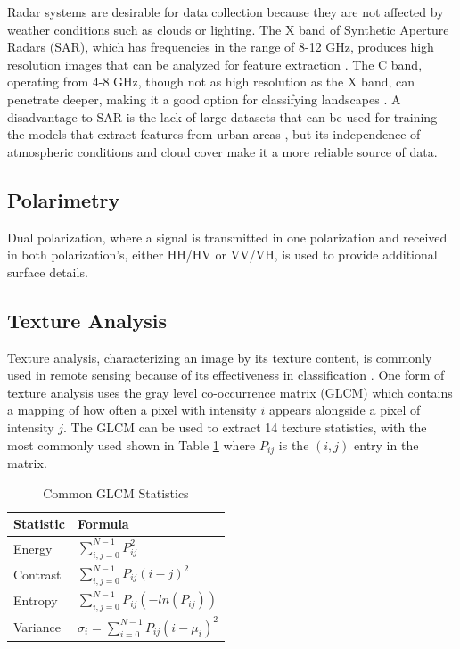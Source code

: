 \documentclass[conference]{IEEEtran}
\begin{document}
		Radar systems are desirable for data collection because they are not affected by weather conditions such as clouds or lighting.
		The X band of Synthetic Aperture Radars (SAR), which has frequencies in the range of 8-12 GHz, produces high resolution images that can be analyzed for feature extraction \cite{Wurm_2017}.
		The C band, operating from 4-8 GHz, though not as high resolution as the X band, can penetrate deeper, making it a good option for classifying landscapes \cite{Hu_2018}. 
		A disadvantage to SAR is the lack of large datasets that can be used for training the models that extract features from urban areas \cite{Shi_Wenzhong_2020}, but its independence of atmospheric conditions and cloud cover make it a more reliable source of data. 


	\subsection{Polarimetry}
		Dual polarization, where a signal is transmitted in one polarization and received in both polarization's, either HH/HV or VV/VH, is used to provide additional surface details. 
		
		
	\subsection{Texture Analysis}
		Texture analysis, characterizing an image by its texture content, is commonly used in remote sensing because of its effectiveness in classification \cite{Huang_2014}.
		One form of texture analysis uses the gray level co-occurrence matrix (GLCM) which contains a mapping of how often a pixel with intensity $i$ appears alongside a pixel of intensity $j$.
		The GLCM can be used to extract 14 texture statistics, with the most commonly used shown in Table \ref{tab:glcm_formulas} where $P_{ij}$ is the $(i,j)$ entry in the matrix. 
		
		\begin{table}[htbp]
			\caption{Common GLCM Statistics}
			\centering
			\begin{tabular}{ll} %
				\\[1ex]
				Statistic & Formula \\ %
				\hline\hline %
				Energy & $\displaystyle\sum_{i,j=0}^{N-1} P_{ij}^2$ \\
				Contrast & $\displaystyle\sum_{i,j=0}^{N-1} P_{ij}(i-j)^2$ \\
				Entropy & $\displaystyle\sum_{i,j=0}^{N-1} P_{ij}(-ln(P_{ij}))$ \\
				Variance & $\sigma_i = \displaystyle\sum_{i=0}^{N-1} P_{ij}(i-\mu_i)^2$ \\[1ex] %
				\hline %
			\end{tabular}
			\label{tab:glcm_formulas}
		\end{table}
\end{document}
